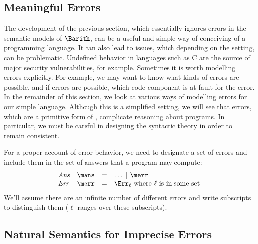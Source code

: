 \subsection{Meaningful Errors}

The development of the previous section, which essentially ignores
errors in the semantic models of $\Barith$, can be a useful and simple
way of conceiving of a programming language.  It can also lead to
issues, which depending on the setting, can be problematic.  Undefined
behavior in languages such as C are the source of major security
vulnerabilities, for example.  Sometimes it is worth modelling errors
explicitly.  For example, we may want to know what kinds of errors are
possible, and if errors are possible, which code component is at fault
for the error.  In the remainder of this section, we look at various
ways of modelling errors for our simple language.  Although this is a
simplified setting, we will see that errors, which are a primitive form
of , complicate reasoning about programs.  In
particular, we must be careful in designing the syntactic theory in
order to remain consistent.


For a proper account of error behavior, we need to designate a set of
errors and include them in the set of answers that a program may compute:
\[
\begin{array}{llcl}
\mathit{Ans} & \mans & = & \dots\ |\ \merr\\
\mathit{Err} & \merr & = & \Err_\ell \text{ where $\ell$ is in some set}
\end{array}
\]
We'll assume there are an infinite number of different errors and
write subscripts to distinguish them ($\ell$ ranges over these subscripts).



\subsection{Natural Semantics for Imprecise Errors}

